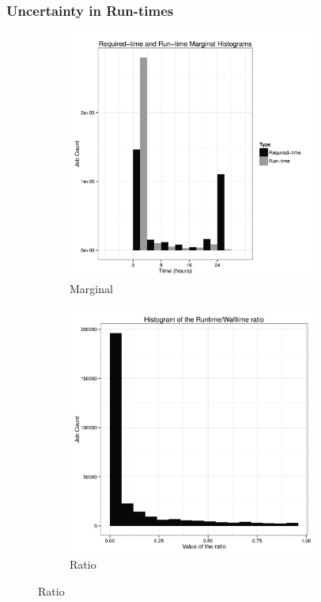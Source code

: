 \documentclass{beamer}
\begin{document}
\begin{frame}
  \frametitle{Uncertainty in Run-times}

\begin{figure}[]
    \centering
    \begin{subfigure}{0.4\textwidth}
        \centering
        \includegraphics[width=0.9\textwidth]{../report/reqrun-0.png}
        \caption{Marginal}
        \label{fig:_report_reqrun_0_png}
    \end{subfigure}
    \begin{subfigure}{0.4\textwidth}
        \centering
        \includegraphics[width=0.9\textwidth]{../report/reqrun-1.png}
        \caption{Ratio}
        \label{fig:_report_reqrun_1_png}
    \end{subfigure}
    \label{fig:global_label}
\end{figure}


\end{frame}
\end{document}

